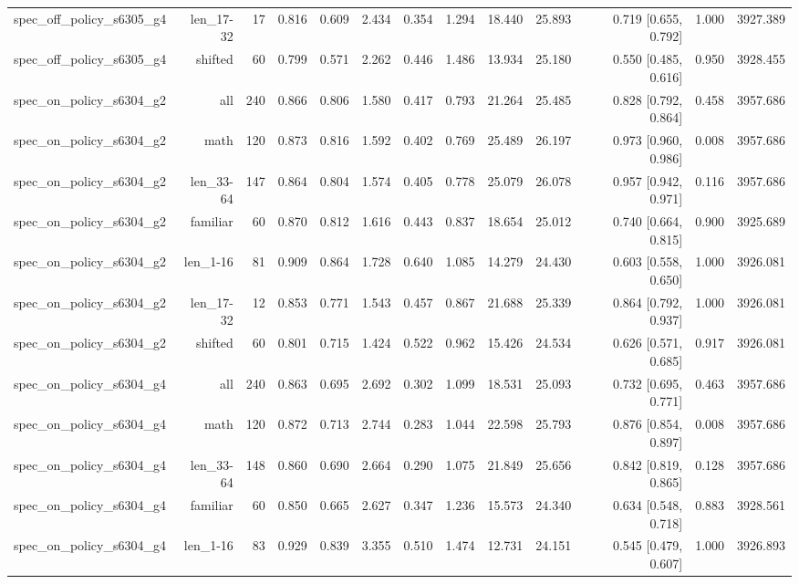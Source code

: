 \begin{tabular}{lrrrrrrrrrrrr}
spec\_off\_policy\_s6305\_g4 & len\_17-32 & 17 & 0.816 & 0.609 & 2.434 & 0.354 & 1.294 & 18.440 & 25.893 & 0.719 [0.655, 0.792] & 1.000 & 3927.389 \\
spec\_off\_policy\_s6305\_g4 & shifted & 60 & 0.799 & 0.571 & 2.262 & 0.446 & 1.486 & 13.934 & 25.180 & 0.550 [0.485, 0.616] & 0.950 & 3928.455 \\
spec\_on\_policy\_s6304\_g2 & all & 240 & 0.866 & 0.806 & 1.580 & 0.417 & 0.793 & 21.264 & 25.485 & 0.828 [0.792, 0.864] & 0.458 & 3957.686 \\
spec\_on\_policy\_s6304\_g2 & math & 120 & 0.873 & 0.816 & 1.592 & 0.402 & 0.769 & 25.489 & 26.197 & 0.973 [0.960, 0.986] & 0.008 & 3957.686 \\
spec\_on\_policy\_s6304\_g2 & len\_33-64 & 147 & 0.864 & 0.804 & 1.574 & 0.405 & 0.778 & 25.079 & 26.078 & 0.957 [0.942, 0.971] & 0.116 & 3957.686 \\
spec\_on\_policy\_s6304\_g2 & familiar & 60 & 0.870 & 0.812 & 1.616 & 0.443 & 0.837 & 18.654 & 25.012 & 0.740 [0.664, 0.815] & 0.900 & 3925.689 \\
spec\_on\_policy\_s6304\_g2 & len\_1-16 & 81 & 0.909 & 0.864 & 1.728 & 0.640 & 1.085 & 14.279 & 24.430 & 0.603 [0.558, 0.650] & 1.000 & 3926.081 \\
spec\_on\_policy\_s6304\_g2 & len\_17-32 & 12 & 0.853 & 0.771 & 1.543 & 0.457 & 0.867 & 21.688 & 25.339 & 0.864 [0.792, 0.937] & 1.000 & 3926.081 \\
spec\_on\_policy\_s6304\_g2 & shifted & 60 & 0.801 & 0.715 & 1.424 & 0.522 & 0.962 & 15.426 & 24.534 & 0.626 [0.571, 0.685] & 0.917 & 3926.081 \\
spec\_on\_policy\_s6304\_g4 & all & 240 & 0.863 & 0.695 & 2.692 & 0.302 & 1.099 & 18.531 & 25.093 & 0.732 [0.695, 0.771] & 0.463 & 3957.686 \\
spec\_on\_policy\_s6304\_g4 & math & 120 & 0.872 & 0.713 & 2.744 & 0.283 & 1.044 & 22.598 & 25.793 & 0.876 [0.854, 0.897] & 0.008 & 3957.686 \\
spec\_on\_policy\_s6304\_g4 & len\_33-64 & 148 & 0.860 & 0.690 & 2.664 & 0.290 & 1.075 & 21.849 & 25.656 & 0.842 [0.819, 0.865] & 0.128 & 3957.686 \\
spec\_on\_policy\_s6304\_g4 & familiar & 60 & 0.850 & 0.665 & 2.627 & 0.347 & 1.236 & 15.573 & 24.340 & 0.634 [0.548, 0.718] & 0.883 & 3928.561 \\
spec\_on\_policy\_s6304\_g4 & len\_1-16 & 83 & 0.929 & 0.839 & 3.355 & 0.510 & 1.474 & 12.731 & 24.151 & 0.545 [0.479, 0.607] & 1.000 & 3926.893 \\

\end{tabular}
